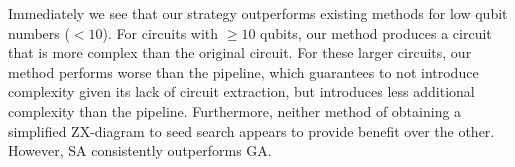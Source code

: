 Immediately we see that our strategy outperforms existing methods for low qubit numbers ($<10$).
For circuits with $\geq 10$ qubits, our method produces a circuit that is more complex than the original circuit.
For these larger circuits, our method performs worse than the  pipeline, which guarantees to not introduce complexity given its lack of circuit extraction, but introduces less additional complexity than the  pipeline.
Furthermore, neither method of obtaining a simplified ZX-diagram to seed search appears to provide benefit over the other.
However, SA consistently outperforms GA.




